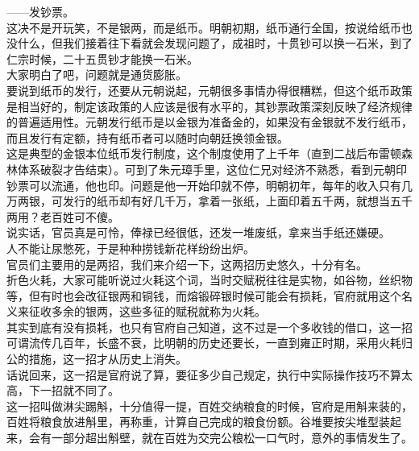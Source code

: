 \begin{multicols}{\theparacolNo}
——发钞票。\\

这决不是开玩笑，不是银两，而是纸币。明朝初期，纸币通行全国，按说给纸币也没什么，但我们接着往下看就会发现问题了，成祖时，十贯钞可以换一石米，到了仁宗时候，二十五贯钞才能换一石米。\\

大家明白了吧，问题就是通货膨胀。\\

要说到纸币的发行，还要从元朝说起，元朝很多事情办得很糟糕，但这个纸币政策是相当好的，制定该政策的人应该是很有水平的，其钞票政策深刻反映了经济规律的普遍适用性。元朝发行纸币是以金银为准备金的，如果没有金银就不发行纸币，而且发行有定额，持有纸币者可以随时向朝廷换领金银。\\

这是典型的金银本位纸币发行制度，这个制度使用了上千年（直到二战后布雷顿森林体系破裂才告结束）。可到了朱元璋手里，这位仁兄对经济不熟悉，看到元朝印钞票可以流通，他也印。问题是他一开始印就不停，明朝初年，每年的收入只有几万两银，可发行的纸币却有好几千万，拿着一张纸，上面印着五千两，就想当五千两用？老百姓可不傻。\\

说实话，官员真是可怜，俸禄已经很低，还发一堆废纸，拿来当手纸还嫌硬。\\

人不能让尿憋死，于是种种捞钱新花样纷纷出炉。\\

官员们主要用的是两招，我们来介绍一下，这两招历史悠久，十分有名。\\

折色火耗，大家可能听说过火耗这个词，当时交赋税往往是实物，如谷物，丝织物等，但有时也会改征银两和铜钱，而熔锻碎银时候可能会有损耗，官府就用这个名义来征收多余的银两，这些多征的赋税就称为火耗。\\

其实到底有没有损耗，也只有官府自己知道，这不过是一个多收钱的借口，这一招可谓流传几百年，长盛不衰，比明朝的历史还要长，一直到雍正时期，采用火耗归公的措施，这一招才从历史上消失。\\

话说回来，这一招是官府说了算，要征多少自己规定，执行中实际操作技巧不算太高，下一招就不同了。\\

这一招叫做淋尖踢斛，十分值得一提，百姓交纳粮食的时候，官府是用斛来装的，百姓将粮食放进斛里，再称重，计算自己完成的粮食份额。谷堆要按尖堆型装起来，会有一部分超出斛壁，就在百姓为交完公粮松一口气时，意外的事情发生了。\\


\end{multicols}
